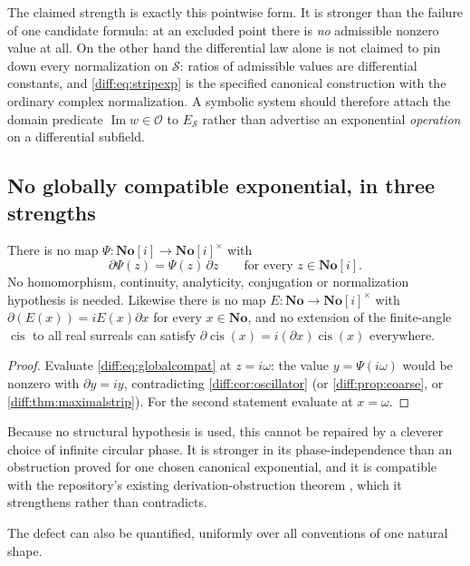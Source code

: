 \documentclass[11pt,letterpaper]{article}
\numberwithin{equation}{section}
\theoremstyle{definition}
\theoremstyle{remark}
\newcommand{\No}{\mathbf{No}}
\newcommand{\SC}{\mathbf{No}[i]}
\newcommand{\der}{\partial}
\newcommand{\Ofin}{\mathcal O}
\newcommand{\Imm}{\operatorname{Im}}
\newcommand{\cis}{\operatorname{cis}}
\newcommand{\Strip}{\mathcal S}
\newcommand{\Estrip}{E_{\Strip}}
\begin{document}
The claimed strength is exactly this pointwise form. It is stronger than the
failure of one candidate formula: at an excluded point there is \emph{no}
admissible nonzero value at all. On the other hand the differential law alone
is not claimed to pin down every normalization on $\Strip$: ratios of
admissible values are differential constants, and \cref{diff:eq:stripexp} is
the specified canonical construction with the ordinary complex normalization.
A symbolic system should therefore attach the domain predicate
$\Imm w\in\Ofin$ to $\Estrip$ rather than advertise an exponential
\emph{operation} on a differential subfield.

\subsection{No globally compatible exponential, in three strengths}
\label{diff:sub:globalexp}

\begin{corollary}
\label{diff:cor:noglobalPsi}
There is no map $\Psi:\SC\to\SC^{\times}$ with
\begin{equation}\label{diff:eq:globalcompat}
 \der\Psi(z)=\Psi(z)\,\der z\qquad\text{for every }z\in\SC .
\end{equation}
No homomorphism, continuity, analyticity, conjugation or normalization
hypothesis is needed. Likewise there is no map $E:\No\to\SC^{\times}$ with
$\der(E(x))=iE(x)\der x$ for every $x\in\No$, and no extension of the
finite-angle $\cis$ to all real surreals can satisfy
$\der\cis(x)=i(\der x)\cis(x)$ everywhere.
\end{corollary}
\begin{proof}
Evaluate \cref{diff:eq:globalcompat} at $z=i\omega$: the value
$y=\Psi(i\omega)$ would be nonzero with $\der y=iy$, contradicting
\cref{diff:cor:oscillator} (or \cref{diff:prop:coarse}, or
\cref{diff:thm:maximalstrip}). For the second statement evaluate at
$x=\omega$.
\end{proof}

Because no structural hypothesis is used, this cannot be repaired by a
cleverer choice of infinite circular phase. It is stronger in its
phase-independence than an obstruction proved for one chosen canonical
exponential, and it is compatible with the repository's existing
derivation-obstruction theorem \cite{RepoAnalysis}, which it strengthens
rather than contradicts.

The defect can also be quantified, uniformly over all conventions of one
natural shape.
\end{document}
